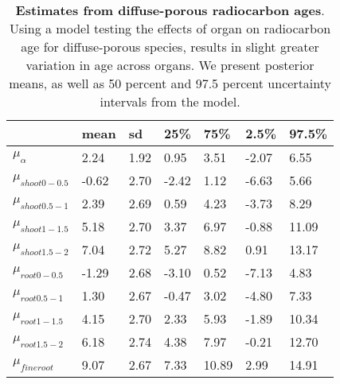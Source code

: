 \documentclass{article}\usepackage[]{graphicx}\usepackage[]{color}
\begin{document}
\begin{table}[ht]
\centering
\caption{\textbf{Estimates from diffuse-porous radiocarbon ages}. Using a model testing the effects of organ on radiocarbon age for diffuse-porous species, results in slight greater variation in age across organs. We present posterior means, as well as 50 percent and 97.5 percent uncertainty intervals from the model.} 
\label{tab:diffradio}
\begingroup\footnotesize
\begin{tabular}{|p{}|p{}|p{}|p{}|p{}|p{}|p{}|}
  \hline
 & mean & sd & 25\% & 75\% & 2.5\% & 97.5\% \\ 
  \hline
$\mu_{\alpha}$ & 2.24 & 1.92 & 0.95 & 3.51 & -2.07 & 6.55 \\ 
  $\mu_{shoot 0-0.5}$ & -0.62 & 2.70 & -2.42 & 1.12 & -6.63 & 5.66 \\ 
  $\mu_{shoot 0.5-1}$ & 2.39 & 2.69 & 0.59 & 4.23 & -3.73 & 8.29 \\ 
  $\mu_{shoot 1-1.5}$ & 5.18 & 2.70 & 3.37 & 6.97 & -0.88 & 11.09 \\ 
  $\mu_{shoot 1.5-2}$ & 7.04 & 2.72 & 5.27 & 8.82 & 0.91 & 13.17 \\ 
  $\mu_{root 0-0.5}$ & -1.29 & 2.68 & -3.10 & 0.52 & -7.13 & 4.83 \\ 
  $\mu_{root 0.5-1}$ & 1.30 & 2.67 & -0.47 & 3.02 & -4.80 & 7.33 \\ 
  $\mu_{root 1-1.5}$ & 4.15 & 2.70 & 2.33 & 5.93 & -1.89 & 10.34 \\ 
  $\mu_{root 1.5-2}$ & 6.18 & 2.74 & 4.38 & 7.97 & -0.21 & 12.70 \\ 
  $\mu_{fineroot}$ & 9.07 & 2.67 & 7.33 & 10.89 & 2.99 & 14.91 \\ 
   \hline
\end{tabular}
\endgroup
\end{table}
\end{document}
